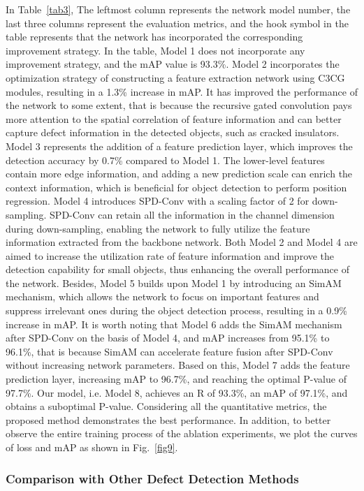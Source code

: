 \documentclass[sn-mathphys,Numbered]{sn-jnl}%
\theoremstyle{thmstyleone}%
\theoremstyle{thmstyletwo}%
\theoremstyle{thmstylethree}%
\begin{document}
In Table~\ref{tab3}, The leftmost column represents the network model number, the last three columns represent the evaluation metrics, and the hook symbol in the table represents that the network has incorporated the corresponding improvement strategy. In the table, Model 1 does not incorporate any improvement strategy, and the mAP value is 93.3\%. Model 2 incorporates the optimization strategy of constructing a feature extraction network using C3CG modules, resulting in a 1.3\% increase in mAP. It has improved the performance of the network to some extent, that is because the recursive gated convolution pays more attention to the spatial correlation of feature information and can better capture defect information in the detected objects, such as cracked insulators. Model 3 represents the addition of a feature prediction layer, which improves the detection accuracy by 0.7\% compared to Model 1. The lower-level features contain more edge information, and adding a new prediction scale can enrich the context information, which is beneficial for object detection to perform position regression. Model 4 introduces SPD-Conv with a scaling factor of 2 for down-sampling. SPD-Conv can retain all the information in the channel dimension during down-sampling, enabling the network to fully utilize the feature information extracted from the backbone network. Both Model 2 and Model 4 are aimed to increase the utilization rate of feature information and improve the detection capability for small objects, thus enhancing the overall performance of the network. Besides, Model 5 builds upon Model 1 by introducing an SimAM mechanism, which allows the network to focus on important features and suppress irrelevant ones during the object detection process, resulting in a 0.9\% increase in mAP. It is worth noting that Model 6 adds the SimAM mechanism after SPD-Conv on the basis of Model 4, and mAP increases from 95.1\% to 96.1\%, that is because SimAM can accelerate feature fusion after SPD-Conv without increasing network parameters. Based on this, Model 7 adds the feature prediction layer, increasing mAP to 96.7\%, and reaching the optimal P-value of 97.7\%. Our model, i.e. Model 8, achieves an R of 93.3\%, an mAP of 97.1\%, and obtains a suboptimal P-value. Considering all the quantitative metrics, the proposed method demonstrates the best performance. In addition, to better observe the entire training process of the ablation experiments, we plot the curves of loss and mAP as shown in Fig.~\ref{fig9}.


\subsubsection {Comparison with Other Defect Detection Methods}
\end{document}
